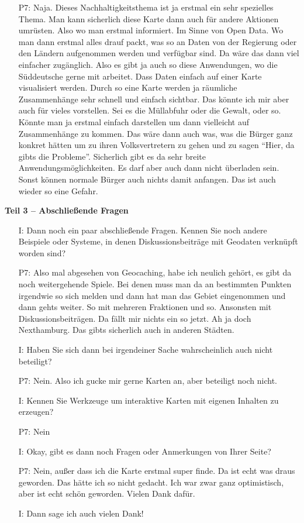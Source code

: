 \begin{itemize}
    \item[P7:] Naja. Dieses Nachhaltigkeitsthema ist ja erstmal ein sehr spezielles Thema. Man kann sicherlich diese Karte dann auch f{\"u}r andere Aktionen umr{\"u}sten. Also wo man erstmal informiert. Im Sinne von Open Data. Wo man dann erstmal alles drauf packt, was so an Daten von der Regierung oder den L{\"a}ndern aufgenommen werden und verf{\"u}gbar sind. Da w{\"a}re das dann viel einfacher zug{\"a}nglich. Also es gibt ja auch so diese Anwendungen, wo die S{\"u}ddeutsche gerne mit arbeitet. Dass Daten einfach auf einer Karte visualisiert werden. Durch so eine Karte werden ja r{\"a}umliche Zusammenh{\"a}nge sehr schnell und einfach sichtbar. Das k{\"o}nnte ich mir aber auch f{\"u}r vieles vorstellen. Sei es die M{\"u}llabfuhr oder die Gewalt, oder so. K{\"o}nnte man ja erstmal einfach darstellen um dann vielleicht auf Zusammenh{\"a}nge zu kommen. Das w{\"a}re dann auch was, was die B{\"u}rger ganz konkret h{\"a}tten um zu ihren Volksvertretern zu gehen und zu sagen "`Hier, da gibts die Probleme"'. Sicherlich gibt es da sehr breite Anwendungsm{\"o}glichkeiten. Es darf aber auch dann nicht {\"u}berladen sein. Sonst k{\"o}nnen normale B{\"u}rger auch nichts damit anfangen. Das ist auch wieder so eine Gefahr.
\end{itemize}

\textbf{Teil 3 -- Abschlie{\ss}ende Fragen}
\begin{itemize}
    \item[I:] Dann noch ein paar abschlie{\ss}ende Fragen. Kennen Sie noch andere Beispiele oder Systeme, in denen Diskussionsbeitr{\"a}ge mit Geodaten verkn{\"u}pft worden sind?
    \item[P7:] Also mal abgesehen von Geocaching, habe ich neulich geh{\"o}rt, es gibt da noch weitergehende Spiele. Bei denen muss man da an bestimmten Punkten irgendwie so sich melden und dann hat man das Gebiet eingenommen und dann gehts weiter. So mit mehreren Fraktionen und so. Ansonsten mit Diskussionsbeitr{\"a}gen. Da f{\"a}llt mir nichts ein so jetzt. Ah ja doch Nexthamburg. Das gibts sicherlich auch in anderen St{\"a}dten.
    \item[I:] Haben Sie sich dann bei irgendeiner Sache wahrscheinlich auch nicht beteiligt?
    \item[P7:] Nein. Also ich gucke mir gerne Karten an, aber beteiligt noch nicht.
    \item[I:] Kennen Sie Werkzeuge um interaktive Karten mit eigenen Inhalten zu erzeugen?
    \item[P7:] Nein
    \item[I:] Okay, gibt es dann noch Fragen oder Anmerkungen von Ihrer Seite? 
    \item[P7:] Nein, au{\ss}er dass ich die Karte erstmal super finde. Da ist echt was draus geworden. Das h{\"a}tte ich so nicht gedacht. Ich war zwar ganz optimistisch, aber ist echt sch{\"o}n geworden. Vielen Dank daf{\"u}r.
    \item[I:] Dann sage ich auch vielen Dank!
\end{itemize}